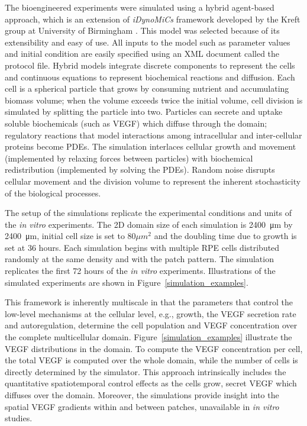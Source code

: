 The bioengineered experiments were simulated using a hybrid agent-based approach, which is an extension of \textsl{iDynoMiCs} framework developed by the Kreft group at University of Birmingham \cite{qanitabaker:Lardon2011IDynoMiCS}. This model was selected because of its extensibility and easy of use. All inputs to the model such as parameter values and initial condition are easily specified using an XML document called the protocol file. Hybrid models integrate discrete components to represent the cells and continuous equations to represent biochemical reactions and diffusion. Each cell is a spherical particle that grows by consuming nutrient and accumulating biomass volume; when the volume exceeds twice the initial volume, cell division is simulated by splitting the particle into two. Particles can secrete and uptake soluble biochemicals (such as VEGF) which diffuse through the domain; regulatory reactions that model interactions among intracellular and inter-cellular proteins become PDEs. The simulation interlaces cellular growth and movement (implemented by relaxing forces between particles) with biochemical redistribution (implemented by solving the PDEs). Random noise disrupts cellular movement and the division volume to represent the inherent stochasticity of the biological processes.

The setup of the simulations replicate the experimental conditions and units of the \textit{in vitro} experiments. The 2D domain size of each simulation is \SI{2400}{\micro\metre} by \SI{2400}{\micro\metre}, initial cell size is set to $80 \mu m^2$ and the doubling time due to growth is set at 36 hours. Each simulation begins with multiple RPE cells distributed randomly at the same density and with the patch pattern. The simulation replicates the first 72 hours of the \textit{in vitro} experiments. Illustrations of the simulated experiments are shown in Figure~\ref{simulation_examples}.

This framework is inherently multiscale in that the parameters that control the low-level mechanisms at the cellular level, e.g., growth, the VEGF secretion rate and autoregulation, determine the cell population and VEGF concentration over the complete multicellular domain. Figure~\ref{simulation_examples} illustrate the VEGF distributions in the domain. To compute the VEGF concentration per cell, the total VEGF is computed over the whole domain, while the number of cells is directly determined by the simulator. This approach intrinsically includes the quantitative spatiotemporal control effects as the cells grow, secret VEGF which diffuses over the domain. Moreover, the simulations provide insight into the spatial VEGF gradients within and between patches, unavailable in \textit{in vitro} studies.

